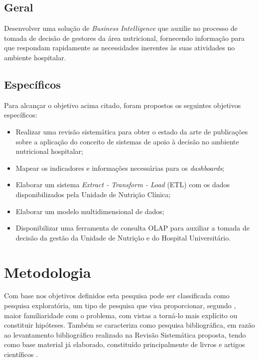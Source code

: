 \subsection{Geral}\label{sec-divisoes-subsection}
Desenvolver uma solução de \textit{Business Intelligence} que auxilie no processo de tomada de decisão de gestores da área nutricional, fornecendo informação para que respondam rapidamente as necessidades inerentes às suas atividades no ambiente hospitalar.

\subsection{Específicos}\label{sec-divisoes-subsection}
Para alcançar o objetivo acima citado, foram propostos os seguintes objetivos específicos:
\begin{itemize}
 \item Realizar uma revisão sistemática para obter o estado da arte de publicações sobre a aplicação do conceito de sistemas de apoio à decisão no ambiente nutricional hospitalar;

 \item Mapear os indicadores e informações necessárias para os \textit{dashboards};

 \item Elaborar um sistema \textit{Extract - Transform - Load} (ETL) com os dados disponibilizados pela Unidade de Nutrição Clínica;
 
 \item Elaborar um modelo multidimensional de dados;
 
 \item Disponibilizar uma ferramenta de consulta OLAP para auxiliar a tomada de decisão da gestão da Unidade de Nutrição e do Hospital Universitário.
\end{itemize}

\section{Metodologia}\label{sec-divisoes}
Com base nos objetivos definidos esta pesquisa pode ser classificada como pesquisa exploratória, um tipo de pesquisa que visa proporcionar, segundo , maior familiaridade com o problema, com vistas a torná-lo mais explícito ou constituir hipóteses.
Também se caracteriza como pesquisa bibliográfica, em razão ao levantamento bibliográfico realizado na Revisão Sistemática proposta, tendo como base material já elaborado, constituído principalmente de livros e artigos científicos \cite{gil2002}.

